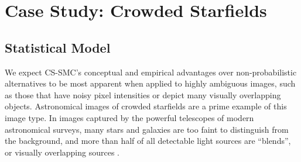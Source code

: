 \documentclass[
  12pt]{article}
\newcommand{\padvert}{\thinspace \vert \thinspace}
\begin{document}







\section{Case Study: Crowded Starfields} \label{smc:crowdedstarfields}

\subsection{Statistical Model} \label{smc:m71model}

We expect CS-SMC's conceptual and empirical advantages over non-probabilistic alternatives to be most apparent when applied to highly ambiguous images, such as those that have noisy pixel intensities or depict many visually overlapping objects. Astronomical images of crowded starfields are a prime example of this image type. In images captured by the powerful telescopes of modern astronomical surveys, many stars and galaxies are too faint to distinguish from the background, and more than half of all detectable light sources are ``blends'', or visually overlapping sources \citep{bosch2018hsc, melchior2021challenge, sanchez2021effects}.
\end{document}
